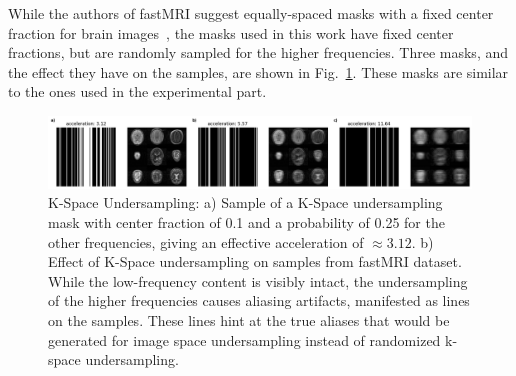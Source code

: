 While the authors of fastMRI suggest equally-spaced masks with a fixed center fraction for brain images~\autocite{zbontar2018fastMRI}, the masks used in this work have fixed center fractions, but are randomly sampled for the higher frequencies. Three masks, and the effect they have on the samples, are shown in Fig.~\ref{fig:kspacemasking}. These masks are similar to the ones used in the experimental part.
\begin{figure}[h]
    \centering
    \includegraphics[width=\textwidth]{images/corruption_mask.png}
    \caption[K-Space Undersampling]{K-Space Undersampling: a) Sample of a K-Space undersampling mask with center fraction of 0.1 and a probability of 0.25 for the other frequencies, giving an effective acceleration of $\approx 3.12$. b) Effect of K-Space undersampling on samples from fastMRI dataset. While the low-frequency content is visibly intact, the undersampling of the higher frequencies causes aliasing artifacts, manifested as lines on the samples. These lines hint at the true aliases that would be generated for image space undersampling instead of randomized k-space undersampling.}
    \label{fig:kspacemasking}
\end{figure}

